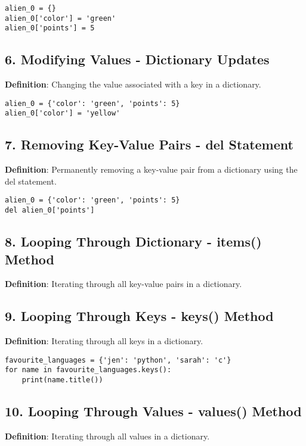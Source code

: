 \begin{lstlisting}
alien_0 = {}
alien_0['color'] = 'green'
alien_0['points'] = 5
\end{lstlisting}

\subsection*{6. Modifying Values - Dictionary Updates}
\textbf{Definition}: Changing the value associated with a key in a dictionary.

\begin{lstlisting}
alien_0 = {'color': 'green', 'points': 5}
alien_0['color'] = 'yellow'
\end{lstlisting}

\subsection*{7. Removing Key-Value Pairs - del Statement}
\textbf{Definition}: Permanently removing a key-value pair from a dictionary using the del statement.

\begin{lstlisting}
alien_0 = {'color': 'green', 'points': 5}
del alien_0['points']
\end{lstlisting}

\subsection*{8. Looping Through Dictionary - items() Method}
\textbf{Definition}: Iterating through all key-value pairs in a dictionary.



\subsection*{9. Looping Through Keys - keys() Method}
\textbf{Definition}: Iterating through all keys in a dictionary.

\begin{lstlisting}
favourite_languages = {'jen': 'python', 'sarah': 'c'}
for name in favourite_languages.keys():
    print(name.title())
\end{lstlisting}

\subsection*{10. Looping Through Values - values() Method}
\textbf{Definition}: Iterating through all values in a dictionary.

